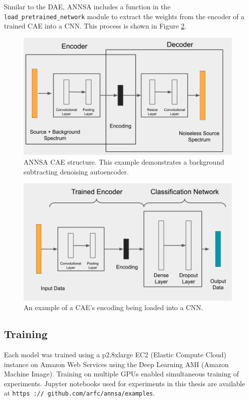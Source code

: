 Similar to the DAE, ANNSA includes a function in the \verb|load_pretrained_network| module to extract the weights from the encoder of a trained CAE into a CNN. This process is shown in Figure \ref{fig:annsa_caednn}.

\begin{figure}[H]
\centering
\includegraphics[trim=0 0 30 0,clip,width=1.0\linewidth]{images/annsa_cae.png}
\caption{ANNSA CAE structure. This example demonstrates a background subtracting denoising autoencoder.}
\label{fig:annsa_cae}
\end{figure}

\begin{figure}[H]
\centering
\includegraphics[trim=0 0 0 0,clip,width=0.9\linewidth]{images/annsa_caednn.png}
\caption{An example of a CAE's encoding being loaded into a CNN.}
\label{fig:annsa_caednn}
\end{figure}


\subsection{Training}

Each model was trained using a p2.8xlarge EC2 (Elastic Compute Cloud) instance on Amazon Web Services using the Deep Learning AMI (Amazon Machine Image). Training on multiple GPUs enabled simultaneous training of experiments. Jupyter notebooks used for experiments in this thesis are available at \verb|https :// github.com/arfc/annsa/examples|.


